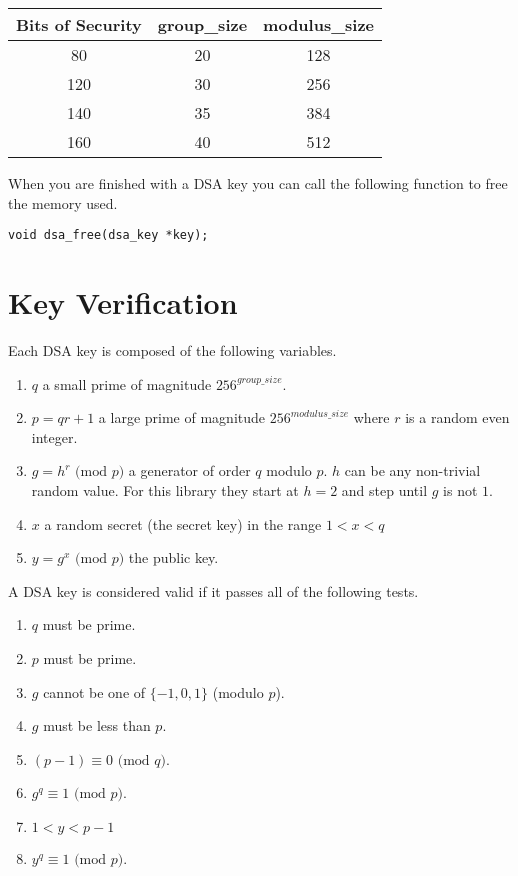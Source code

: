 \documentclass[b5paper]{book}
\begin{document}
\begin{center}
\begin{tabular}{|c|c|c|}
\hline \textbf{Bits of Security} & \textbf{group\_size} & \textbf{modulus\_size} \\
\hline 80  & 20 & 128 \\
\hline 120 & 30 & 256 \\
\hline 140 & 35 & 384 \\
\hline 160 & 40 & 512 \\
\hline
\end{tabular}
\end{center}

When you are finished with a DSA key you can call the following function to free the memory used.
\begin{verbatim}
void dsa_free(dsa_key *key);
\end{verbatim}

\section{Key Verification}
Each DSA key is composed of the following variables.

\begin{enumerate}
  \item $q$ a small prime of magnitude $256^{group\_size}$.  
  \item $p = qr + 1$ a large prime of magnitude $256^{modulus\_size}$ where $r$ is a random even integer.
  \item $g = h^r \mbox{ (mod }p\mbox{)}$ a generator of order $q$ modulo $p$.  $h$ can be any non-trivial random 
        value.  For this library they start at $h = 2$ and step until $g$ is not $1$.
  \item $x$ a random secret (the secret key) in the range $1 < x < q$ 
  \item $y = g^x \mbox{ (mod }p\mbox{)}$ the public key.
\end{enumerate}

A DSA key is considered valid if it passes all of the following tests.

\begin{enumerate}
   \item $q$ must be prime.
   \item $p$ must be prime.
   \item $g$ cannot be one of $\lbrace -1, 0, 1 \rbrace$ (modulo $p$).
   \item $g$ must be less than $p$.
   \item $(p-1) \equiv 0 \mbox{ (mod }q\mbox{)}$.
   \item $g^q \equiv 1 \mbox{ (mod }p\mbox{)}$.
   \item $1 < y < p - 1$
   \item $y^q \equiv 1 \mbox{ (mod }p\mbox{)}$.
\end{enumerate}
\end{document}
